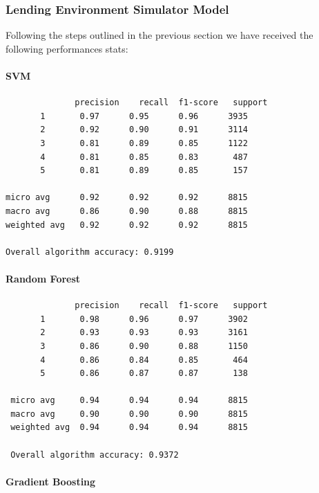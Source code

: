 \hypertarget{lending-environment-simulator-model}{%
\subsubsection{Lending Environment Simulator
Model}\label{lending-environment-simulator-model}}

Following the steps outlined in the previous section we have received
the following performances stats:

\hypertarget{svm}{%
\paragraph{SVM}\label{svm}}

\begin{verbatim}
              precision    recall  f1-score   support
       1       0.97      0.95      0.96      3935
       2       0.92      0.90      0.91      3114
       3       0.81      0.89      0.85      1122
       4       0.81      0.85      0.83       487
       5       0.81      0.89      0.85       157
       
micro avg      0.92      0.92      0.92      8815
macro avg      0.86      0.90      0.88      8815
weighted avg   0.92      0.92      0.92      8815

Overall algorithm accuracy: 0.9199
\end{verbatim}

\hypertarget{random-forest}{%
\paragraph{Random Forest}\label{random-forest}}

\begin{verbatim}
              precision    recall  f1-score   support
       1       0.98      0.96      0.97      3902
       2       0.93      0.93      0.93      3161
       3       0.86      0.90      0.88      1150
       4       0.86      0.84      0.85       464
       5       0.86      0.87      0.87       138
       
 micro avg     0.94      0.94      0.94      8815
 macro avg     0.90      0.90      0.90      8815
 weighted avg  0.94      0.94      0.94      8815
 
 Overall algorithm accuracy: 0.9372
\end{verbatim}

\hypertarget{gradient-boosting}{%
\paragraph{Gradient Boosting}\label{gradient-boosting}}


